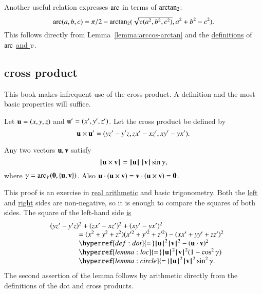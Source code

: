 Another useful relation expresses $\operatorname{arc}$ in terms of ${\operatorname{arctan_2}}$:
  \begin{displaymath}
  \arc(a,b,c) = 
    \pi/2 - \atn({\sqrt{\ups(a^2,b^2,c^2)}},{ a^2 + b^2 - c^2}).
    \end{displaymath}
This follows directly from Lemma~\ref{lemma:arccos-arctan} and the \hyperref[def:arc]{definitions}
of $\operatorname{arc}$ \hyperref[def:ups]{and $\ups$}.



\subsection{cross product} 

This book makes infrequent use of the cross product.
A definition and the most basic properties will suffice.

\begin{definition}\label{def:cross}   
Let ${\mathbf u} =(x,y,z)$ and ${\mathbf u}' = (x',y',z')$.  
Let the cross product be defined
by
    \begin{displaymath}
    {\mathbf u} \times {\mathbf u}' = (y z' - y' z, z x' - x z', x y' - y x').
    \end{displaymath}
%
%
%
\end{definition}

\begin{lemma}  
Any two vectors ${\mathbf u},{\mathbf v}$ satisfy
    \begin{displaymath}{{\hskip0.1em|\hskip-0.15em|\hskip0.1em}{\mathbf u}\times {\mathbf v}{\hskip0.1em|\hskip-0.15em|\hskip0.1em}} = {{\hskip0.1em|\hskip-0.15em|\hskip0.1em}{\mathbf u}{\hskip0.1em|\hskip-0.15em|\hskip0.1em}}\,{{\hskip0.1em|\hskip-0.15em|\hskip0.1em}{\mathbf v}{\hskip0.1em|\hskip-0.15em|\hskip0.1em}}\sin\gamma,\end{displaymath}
where $\gamma=\operatorname{arc}_V({\mathbf 0},\{{\mathbf u},{\mathbf v}\})$.
Also ${\mathbf u} \cdot ({\mathbf u}\times {\mathbf v}) = {\mathbf v}\cdot ({\mathbf u}\times {\mathbf v}) = {\mathbf 0}$.
\end{lemma}

\begin{proved}  This proof is an exercise in \hyperref[back:analysis]{real arithmetic} and basic trigonometry.
   Both the \hyperref[eqn:dot]{left} and \hyperref[lemma:sin-pos]{right} sides are non-negative, so it is enough to compare the
   squares of both sides.  The square of the left-hand side \hyperref[def:cross]{is}
   \begin{displaymath}
   \begin{array}{lll}
   &(y z'- y'z)^2 + (z x' - x z')^2 + (x y' - y x')^2 \\
    &\qquad\qquad=
   (x^2 + y^2 + z^2)(x'^2 + y'^2 + z'^2) - (x x' + y y' + z z')^2
   \\&\qquad\qquad \hyperref[def:dot]{=\,} 
    \normo{\u}^2\normo{\v}^2 - (\u\cdot \v)^2 \\
   &\qquad\qquad\hyperref[lemma:loc]{=\,} \normo{\u}^2\normo{\v}^2 ( 1 - \cos^2\gamma)\\
   &\qquad\qquad\hyperref[lemma:circle]{=\,} \normo{\u}^2\normo{\v}^2 \sin^2\gamma.
   \end{array}
   \end{displaymath}
The second assertion of the lemma follows by arithmetic directly from the definitions of the dot and cross products.
\swallowed\end{proved}


